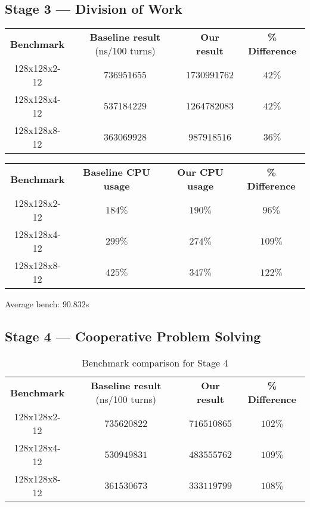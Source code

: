 \documentclass[11pt,a4paper,dvipsnames,cmyk]{scrartcl}
\begin{document}
\subsection*{Stage 3 --- Division of Work}%
\label{sub:division-of-work}
\begin{center}
    \begin{tabular}{|c|c|c|c|}
        \hline
        \textbf{Benchmark} & \textbf{Baseline result} (ns/100 turns) &
        \textbf{Our result} & \textbf{\% Difference} \\ \hhline{|=|=|=|=|}
        128x128x2-12 & $736951655$ & $1730991762$ & $42\%$ \\ \hline
        128x128x4-12 & $537184229$ & $1264782083$ & $42\%$ \\ \hline
        128x128x8-12 & $363069928$ & $987918516$ & $36\%$ \\ \hline
    \end{tabular}
\end{center}
\begin{center}
    \begin{tabular}{|c|c|c|c|}
        \hline
        \textbf{Benchmark} & \textbf{Baseline CPU usage} &
        \textbf{Our CPU usage} & \textbf{\% Difference} \\ \hhline{|=|=|=|=|}
        128x128x2-12 & $184\%$ & $190\%$ & $96\%$ \\ \hline
        128x128x4-12 & $299\%$ & $274\%$ & $109\%$ \\ \hline
        128x128x8-12 & $425\%$ & $347\%$ & $122\%$ \\ \hline
    \end{tabular}
\end{center}

Average bench: $90.832$s

\subsection*{Stage 4 --- Cooperative Problem Solving}%
\label{sub:coop-solving}
\begin{table}[ht]
\caption{Benchmark comparison for Stage 4}
\begin{center}
    \begin{tabular}{|c|c|c|c|}
        \hline
        \textbf{Benchmark} & \textbf{Baseline result} (ns/100 turns) &
        \textbf{Our result} & \textbf{\% Difference} \\ \hhline{|=|=|=|=|}
        128x128x2-12 & $735620822$ & $716510865$ & $102\%$ \\ \hline
        128x128x4-12 & $530949831$ & $483555762$ & $109\%$ \\ \hline
        128x128x8-12 & $361530673$ & $333119799$ & $108\%$ \\ \hline
    \end{tabular}
\end{center}
\end{table}
\end{document}
